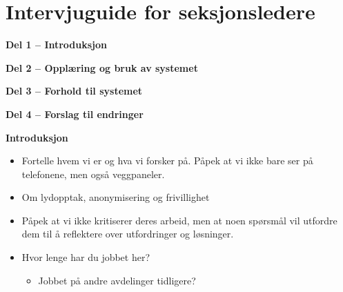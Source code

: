 \chapter{Intervjuguide for seksjonsledere}
\label{chp:appendix_intervjuguide_seksjonsledere}

\textbf{Del 1 – Introduksjon}

\noindent
\textbf{Del 2 – Opplæring og bruk av systemet}

\noindent
\textbf{Del 3 – Forhold til systemet}

\noindent
\textbf{Del 4 – Forslag til endringer}
 
\noindent
\textbf{Introduksjon}
\begin{itemize}
    \item Fortelle hvem vi er og hva vi forsker på. Påpek at vi ikke bare ser på telefonene, men også veggpaneler.
    \item Om lydopptak, anonymisering og frivillighet
    \item Påpek at vi ikke kritiserer deres arbeid, men at noen spørsmål vil utfordre dem til å reflektere over utfordringer og løsninger.
\end{itemize}

\begin{itemize}
	\item Hvor lenge har du jobbet her?
    \begin{itemize}
		\item Jobbet på andre avdelinger tidligere?
 	\end{itemize}
\end{itemize}

